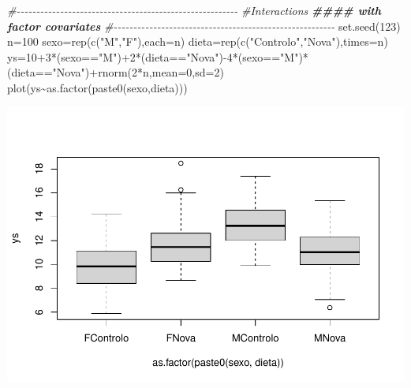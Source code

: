 \documentclass[
]{book}
\newenvironment{Shaded}{\begin{snugshade}}{\end{snugshade}}
\newcommand{\AttributeTok}[1]{\textcolor[rgb]{0.77,0.63,0.00}{#1}}
\newcommand{\CommentTok}[1]{\textcolor[rgb]{0.56,0.35,0.01}{\textit{#1}}}
\newcommand{\DecValTok}[1]{\textcolor[rgb]{0.00,0.00,0.81}{#1}}
\newcommand{\DocumentationTok}[1]{\textcolor[rgb]{0.56,0.35,0.01}{\textbf{\textit{#1}}}}
\newcommand{\FunctionTok}[1]{\textcolor[rgb]{0.00,0.00,0.00}{#1}}
\newcommand{\NormalTok}[1]{#1}
\newcommand{\OtherTok}[1]{\textcolor[rgb]{0.56,0.35,0.01}{#1}}
\newcommand{\SpecialCharTok}[1]{\textcolor[rgb]{0.00,0.00,0.00}{#1}}
\newcommand{\StringTok}[1]{\textcolor[rgb]{0.31,0.60,0.02}{#1}}
\begin{document}
\begin{Shaded}
\begin{Highlighting}[]
\CommentTok{\#{-}{-}{-}{-}{-}{-}{-}{-}{-}{-}{-}{-}{-}{-}{-}{-}{-}{-}{-}{-}{-}{-}{-}{-}{-}{-}{-}{-}{-}{-}{-}{-}{-}{-}{-}{-}{-}{-}{-}{-}{-}{-}{-}{-}{-}{-}{-}{-}{-}{-}{-}{-}{-}{-}{-}{-}}
\CommentTok{\#Interactions}
\DocumentationTok{\#\#\#\# with factor covariates}
\CommentTok{\#{-}{-}{-}{-}{-}{-}{-}{-}{-}{-}{-}{-}{-}{-}{-}{-}{-}{-}{-}{-}{-}{-}{-}{-}{-}{-}{-}{-}{-}{-}{-}{-}{-}{-}{-}{-}{-}{-}{-}{-}{-}{-}{-}{-}{-}{-}{-}{-}{-}{-}{-}{-}{-}{-}{-}{-}}
\FunctionTok{set.seed}\NormalTok{(}\DecValTok{123}\NormalTok{)}
\NormalTok{n}\OtherTok{=}\DecValTok{100}
\NormalTok{sexo}\OtherTok{=}\FunctionTok{rep}\NormalTok{(}\FunctionTok{c}\NormalTok{(}\StringTok{"M"}\NormalTok{,}\StringTok{"F"}\NormalTok{),}\AttributeTok{each=}\NormalTok{n)}
\NormalTok{dieta}\OtherTok{=}\FunctionTok{rep}\NormalTok{(}\FunctionTok{c}\NormalTok{(}\StringTok{"Controlo"}\NormalTok{,}\StringTok{"Nova"}\NormalTok{),}\AttributeTok{times=}\NormalTok{n)}
\NormalTok{ys}\OtherTok{=}\DecValTok{10}\SpecialCharTok{+}\DecValTok{3}\SpecialCharTok{*}\NormalTok{(sexo}\SpecialCharTok{==}\StringTok{"M"}\NormalTok{)}\SpecialCharTok{+}\DecValTok{2}\SpecialCharTok{*}\NormalTok{(dieta}\SpecialCharTok{==}\StringTok{"Nova"}\NormalTok{)}\SpecialCharTok{{-}}\DecValTok{4}\SpecialCharTok{*}\NormalTok{(sexo}\SpecialCharTok{==}\StringTok{"M"}\NormalTok{)}\SpecialCharTok{*}\NormalTok{(dieta}\SpecialCharTok{==}\StringTok{"Nova"}\NormalTok{)}\SpecialCharTok{+}\FunctionTok{rnorm}\NormalTok{(}\DecValTok{2}\SpecialCharTok{*}\NormalTok{n,}\AttributeTok{mean=}\DecValTok{0}\NormalTok{,}\AttributeTok{sd=}\DecValTok{2}\NormalTok{)}
\FunctionTok{plot}\NormalTok{(ys}\SpecialCharTok{\textasciitilde{}}\FunctionTok{as.factor}\NormalTok{(}\FunctionTok{paste0}\NormalTok{(sexo,dieta)))}
\end{Highlighting}
\end{Shaded}

\includegraphics{ECOMODbook_files/figure-latex/a11.1-1.pdf}
\end{document}
